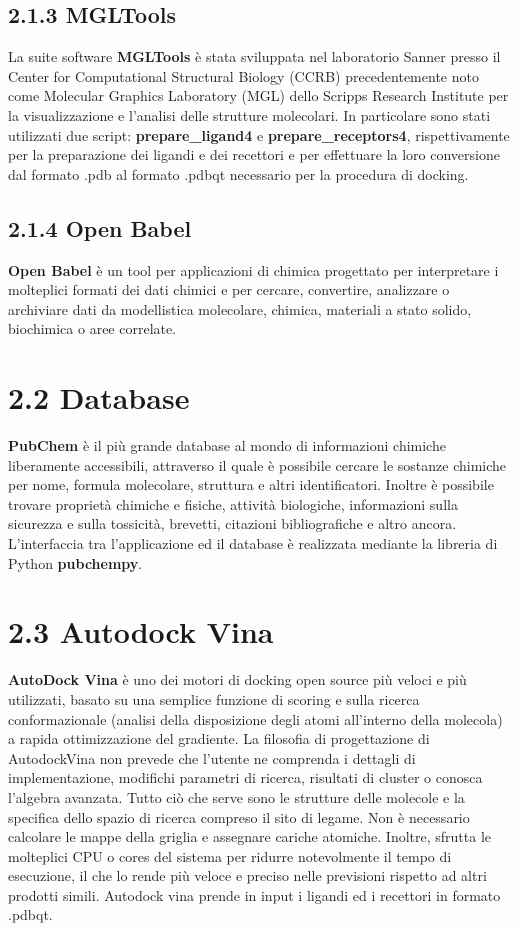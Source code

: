 \subsection*{2.1.3 MGLTools}
\def\baselinestretch{1.66}
\noindent La suite software \textbf{MGLTools} è stata sviluppata nel laboratorio Sanner presso il Center for Computational Structural Biology (CCRB) precedentemente noto come Molecular Graphics Laboratory (MGL) dello Scripps Research Institute per la visualizzazione e l'analisi delle strutture molecolari. In particolare sono stati utilizzati due script: \textbf{prepare\_ligand4} e \textbf{prepare\_receptors4}, rispettivamente per la preparazione dei ligandi e dei recettori e per effettuare la loro conversione dal formato .pdb al formato .pdbqt necessario per la procedura di docking.

\subsection*{2.1.4 Open Babel}
\def\baselinestretch{1.66}
\noindent \textbf{Open Babel} è un tool per applicazioni di chimica progettato per interpretare i molteplici formati dei dati chimici e per cercare, convertire, analizzare o archiviare dati da modellistica molecolare, chimica, materiali a stato solido, biochimica o aree correlate.

\section*{2.2 Database}
\def\baselinestretch{1.66}
\noindent \textbf{PubChem} è il più grande database al mondo di informazioni chimiche liberamente accessibili, attraverso il quale è possibile cercare le sostanze chimiche per nome, formula molecolare, struttura e altri identificatori. Inoltre è possibile trovare proprietà chimiche e fisiche, attività biologiche, informazioni sulla sicurezza e sulla tossicità, brevetti, citazioni bibliografiche e altro ancora. L'interfaccia tra l'applicazione ed il database è realizzata mediante la libreria di Python \textbf{pubchempy}. 

\section*{2.3 Autodock Vina}
\def\baselinestretch{1.66}
\noindent \textbf{AutoDock Vina} è uno dei motori di docking open source più veloci e più utilizzati, basato su una semplice funzione di scoring e sulla ricerca conformazionale (analisi della disposizione degli atomi all'interno della molecola) a rapida ottimizzazione del gradiente. La filosofia di progettazione di AutodockVina non prevede che l'utente ne comprenda i dettagli di implementazione, modifichi parametri di ricerca, risultati di cluster o conosca l'algebra avanzata. Tutto ciò che serve sono le strutture delle molecole e la specifica dello spazio di ricerca compreso il sito di legame. Non è necessario calcolare le mappe della griglia e assegnare cariche atomiche. Inoltre, sfrutta le molteplici CPU o cores del sistema per ridurre notevolmente il tempo di esecuzione, il che lo rende più veloce e preciso nelle previsioni rispetto ad altri prodotti simili. Autodock vina prende in input i ligandi ed i recettori in formato .pdbqt.